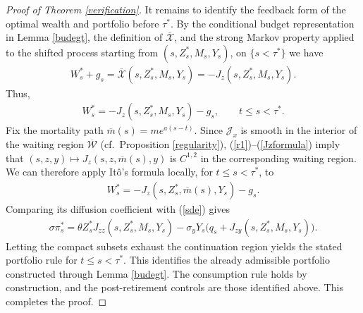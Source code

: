\documentclass[a4paper,11pt]{amsart}
\numberwithin{equation}{section}
\newcommand{\blue}[1]{{\color{black}#1}}
\begin{document}
{\begin{proof}[Proof of Theorem \ref{verification}]
It remains to identify the feedback form of the optimal wealth and portfolio before $\tau^\ast$. By the conditional budget representation in Lemma \ref{budegt}, the definition of $\overline{\mathcal X}$, and the strong Markov property applied to the shifted process starting from $(s,Z_s^\ast,M_s,Y_s)$, on $\{s<\tau^\ast\}$ we have
\begin{align*}
W_s^\ast+g_s=\overline{\mathcal X}(s,Z_s^\ast,M_s,Y_s)=-J_z(s,Z_s^\ast,M_s,Y_s).
\end{align*}
Thus,
\begin{align*}
W_s^\ast=-J_z(s,Z_s^\ast,M_s,Y_s)-g_s,\qquad t\leq s<\tau^\ast.
\end{align*}
\blue{Fix the mortality path $\overline m(s)=me^{a(s-t)}$. Since $\mathcal J_x$ is smooth in the interior of the waiting region $\overline{\mathcal W}$ (cf.\ Proposition \ref{regularity}), (\ref{r1})--(\ref{Jzformula}) imply that $(s,z,y)\mapsto J_z(s,z,\overline m(s),y)$ is $C^{1,2}$ in the corresponding waiting region.  We can therefore apply It\^o's formula locally, for $t\leq s<\tau^\ast$, to
\begin{align*}
W_s^\ast=-J_z(s,Z_s^\ast,\overline m(s),Y_s)-g_s.
\end{align*}
Comparing its diffusion coefficient with (\ref{sde}) gives
\begin{align*}
\sigma\pi_s^\ast=\theta Z_s^\ast J_{zz}(s,Z_s^\ast,M_s,Y_s)-\sigma_yY_s\big(q_s+J_{zy}(s,Z_s^\ast,M_s,Y_s)\big).
\end{align*}
}
Letting the compact subsets exhaust the continuation region yields the stated portfolio rule for $t\leq s<\tau^\ast$. \blue{This identifies the already admissible portfolio constructed through Lemma \ref{budegt}.} The consumption rule holds by construction, and the post-retirement controls are those identified above. This completes the proof.
\end{proof}








}
\end{document}
